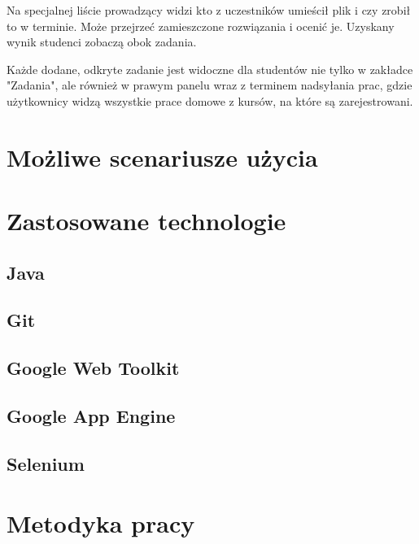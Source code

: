 \documentclass{pracamgr}
\begin{document}
Na specjalnej liście prowadzący widzi kto z uczestników umieścił plik
i czy zrobił to w terminie. Może przejrzeć zamieszczone rozwiązania 
i ocenić je. Uzyskany wynik studenci zobaczą obok zadania.

Każde dodane, odkryte zadanie jest widoczne dla studentów nie tylko w zakładce
"Zadania", ale również w prawym panelu wraz z terminem nadsyłania prac, 
gdzie użytkownicy widzą wszystkie prace domowe z kursów, na które są
zarejestrowani.

%
%
\chapter{Możliwe scenariusze użycia}


%
%
\chapter{Zastosowane technologie}

\section{Java}
\section{Git}
\section{Google Web Toolkit}
\section{Google App Engine}
\section{Selenium}

%
%
\chapter{Metodyka pracy}

%
%
\end{document}
